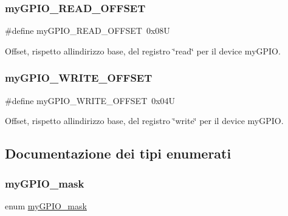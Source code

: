 \subsubsection{\texorpdfstring{my\+G\+P\+I\+O\+\_\+\+R\+E\+A\+D\+\_\+\+O\+F\+F\+S\+ET}{myGPIO\_READ\_OFFSET}}
{\footnotesize\ttfamily \#define my\+G\+P\+I\+O\+\_\+\+R\+E\+A\+D\+\_\+\+O\+F\+F\+S\+ET~0x08U}



Offset, rispetto all\textquotesingle{}indirizzo base, del registro \char`\"{}read\char`\"{} per il device my\+G\+P\+IO. 

\mbox{\label{group__bare-metal_ga2e45778b6ca9ce6f5768b3f7a4557ce1}} 
\subsubsection{\texorpdfstring{my\+G\+P\+I\+O\+\_\+\+W\+R\+I\+T\+E\+\_\+\+O\+F\+F\+S\+ET}{myGPIO\_WRITE\_OFFSET}}
{\footnotesize\ttfamily \#define my\+G\+P\+I\+O\+\_\+\+W\+R\+I\+T\+E\+\_\+\+O\+F\+F\+S\+ET~0x04U}



Offset, rispetto all\textquotesingle{}indirizzo base, del registro \char`\"{}write\char`\"{} per il device my\+G\+P\+IO. 



\subsection{Documentazione dei tipi enumerati}
\mbox{\label{group__bare-metal_ga402a0d20afc0cb7c25554b8b023f4253}} 
\subsubsection{\texorpdfstring{my\+G\+P\+I\+O\+\_\+mask}{myGPIO\_mask}}
{\footnotesize\ttfamily enum \hyperlink{group__bare-metal_ga402a0d20afc0cb7c25554b8b023f4253}{my\+G\+P\+I\+O\+\_\+mask}}




